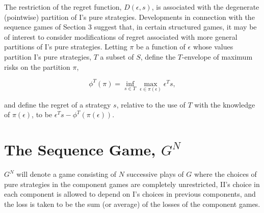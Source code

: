 \documentclass[11pt]{article}
\numberwithin{equation}{section}
\theoremstyle{boldStyle}
\begin{document}
The restriction of the regret function, \( D(\epsilon, s) \), is associated with the degenerate (pointwise) partition of I's pure strategies. 
Developments in connection with the sequence games of Section 3 suggest that, in certain structured games, 
it may be of interest to consider modifications of regret associated with more general partitions of I's pure strategies. 
Letting \( \pi \) be a function of \( \epsilon \) whose values partition I's pure strategies, 
\( T \) a subset of \( S \), define the \( T \)-envelope of maximum risks on the partition \( \pi \),

\begin{equation}
    \phi^T (\pi) = \inf_{s \in T} \max_{\epsilon \in \pi (\epsilon)} \epsilon^T s,
\end{equation}

and define the regret of a strategy \( s \), relative to the use of \( T \) with the knowledge of \( \pi (\epsilon) \), 
to be \( \epsilon^T s - \phi^T (\pi( \epsilon )) \).













\newpage
\section{The Sequence Game, $G^N$}



\( G^N \) will denote a game consisting of \( N \) successive plays of \( G \) where the choices of pure strategies in the component 
games are completely unrestricted, II's choice in each component is allowed to depend on I's choices in previous components, 
and the loss is taken to be the sum (or average) of the losses of the component games.
\end{document}
